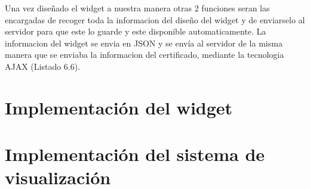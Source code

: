 
Una vez diseñado el widget a nuestra manera otras 2 funciones seran las encargadas de recoger toda la informacion del diseño del widget y de enviarselo al servidor para que este lo guarde y este disponible automaticamente. La informacion del widget se envia en JSON y se envía al servidor de la misma manera que se enviaba la informacion del certificado, mediante la tecnologia AJAX (Listado 6.6).\\


\section{Implementación del widget}

\section{Implementación del sistema de visualización}